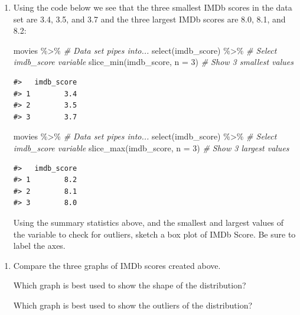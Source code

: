 \documentclass[
]{report}
\newenvironment{Shaded}{\begin{snugshade}}{\end{snugshade}}
\newcommand{\AttributeTok}[1]{\textcolor[rgb]{0.77,0.63,0.00}{#1}}
\newcommand{\CommentTok}[1]{\textcolor[rgb]{0.56,0.35,0.01}{\textit{#1}}}
\newcommand{\DecValTok}[1]{\textcolor[rgb]{0.00,0.00,0.81}{#1}}
\newcommand{\FunctionTok}[1]{\textcolor[rgb]{0.00,0.00,0.00}{#1}}
\newcommand{\NormalTok}[1]{#1}
\newcommand{\SpecialCharTok}[1]{\textcolor[rgb]{0.00,0.00,0.00}{#1}}
\begin{document}
\begin{enumerate}
\def\labelenumi{\arabic{enumi}.}
\setcounter{enumi}{11}
\item
  Using the code below we see that the three smallest IMDb scores in the data set are 3.4, 3.5, and 3.7 and the three largest IMDb scores are 8.0, 8.1, and 8.2:

\begin{Shaded}
\begin{Highlighting}[]
\NormalTok{movies }\SpecialCharTok{\%\textgreater{}\%} \CommentTok{\# Data set pipes into...}
  \FunctionTok{select}\NormalTok{(imdb\_score) }\SpecialCharTok{\%\textgreater{}\%} \CommentTok{\# Select imdb\_score variable}
  \FunctionTok{slice\_min}\NormalTok{(imdb\_score, }\AttributeTok{n =} \DecValTok{3}\NormalTok{)  }\CommentTok{\# Show 3 smallest values}
\end{Highlighting}
\end{Shaded}

\begin{verbatim}
#>   imdb_score
#> 1        3.4
#> 2        3.5
#> 3        3.7
\end{verbatim}

\begin{Shaded}
\begin{Highlighting}[]
\NormalTok{movies }\SpecialCharTok{\%\textgreater{}\%} \CommentTok{\# Data set pipes into...}
  \FunctionTok{select}\NormalTok{(imdb\_score) }\SpecialCharTok{\%\textgreater{}\%} \CommentTok{\# Select imdb\_score variable}
  \FunctionTok{slice\_max}\NormalTok{(imdb\_score, }\AttributeTok{n =} \DecValTok{3}\NormalTok{)  }\CommentTok{\# Show 3 largest values}
\end{Highlighting}
\end{Shaded}

\begin{verbatim}
#>   imdb_score
#> 1        8.2
#> 2        8.1
#> 3        8.0
\end{verbatim}

  Using the summary statistics above, and the smallest and largest values of the variable to check for outliers, sketch a box plot of IMDb Score. Be sure to label the axes.
\end{enumerate}

\vspace{1.5in}

\begin{enumerate}
\def\labelenumi{\arabic{enumi}.}
\setcounter{enumi}{12}
\item
  Compare the three graphs of IMDb scores created above.

  Which graph is best used to show the shape of the distribution?

  \vspace{0.5in}

  Which graph is best used to show the outliers of the distribution?

  \vspace{0.5in}
\end{enumerate}
\end{document}
